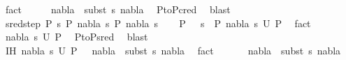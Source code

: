 \begin{isabellebody}
\ fact{\isacharplus}{\kern0pt}\isanewline
\ \ \isamarkupfalse%
\ \isamarkupfalse%
\ {\isachardoublequoteopen}nabla{}\ {\isasymTurnstile}\ {\isacharparenleft}{\kern0pt}subst\ s{}{\isacharparenright}{\kern0pt}\ nabla{}{\isachardoublequoteclose}\ \isamarkupfalse%
\ P{}{\isacharunderscore}{\kern0pt}to{\isacharunderscore}{\kern0pt}P{}{\isacharunderscore}{\kern0pt}cred\ \isamarkupfalse%
\ blast\isanewline
{}\isamarkupfalse%
\isanewline
\ \ \isamarkupfalse%
\ {\isacharparenleft}{\kern0pt}sred{\isacharunderscore}{\kern0pt}step\ P{}\ s\ P{}\ nabla{}\ s{}\ P{}\ nabla{}\ s{}{\isacharparenright}{\kern0pt}\isanewline
\ \ \isamarkupfalse%
\ {\isachardoublequoteopen}P{}\ \ {\isasymturnstile}\ s\ {\isasymleadsto}\ P{}{\isachardoublequoteclose}\ {\isachardoublequoteopen}{\isacharparenleft}{\kern0pt}nabla{}{\isacharcomma}{\kern0pt}\ s{}{\isacharparenright}{\kern0pt}{\isasymin}\ U\ P{}{\isachardoublequoteclose}\ \isamarkupfalse%
\ fact{\isacharplus}{\kern0pt}\ \isanewline
\ \ \isamarkupfalse%
\ \isamarkupfalse%
\ {\isachardoublequoteopen}{\isacharparenleft}{\kern0pt}nabla{}{\isacharcomma}{\kern0pt}\ s{}{\isacharparenright}{\kern0pt}{\isasymin}\ U\ P{}{\isachardoublequoteclose}\ \isamarkupfalse%
\ P{}{\isacharunderscore}{\kern0pt}to{\isacharunderscore}{\kern0pt}P{}{\isacharunderscore}{\kern0pt}sred\ \isamarkupfalse%
\ blast\ \isanewline
\ \ \isamarkupfalse%
\ \isamarkupfalse%
\ IH{\isacharcolon}{\kern0pt}\ {\isachardoublequoteopen}{\isacharparenleft}{\kern0pt}nabla{}{\isacharcomma}{\kern0pt}\ s{}{\isacharparenright}{\kern0pt}{\isasymin}\ U\ P{}\ {\isasymLongrightarrow}\ \ nabla{}\ {\isasymTurnstile}\ {\isacharparenleft}{\kern0pt}subst\ s{}{\isacharparenright}{\kern0pt}\ nabla{}{\isachardoublequoteclose}\ \isamarkupfalse%
\ fact\ \isanewline
\ \ \isamarkupfalse%
\ \isamarkupfalse%
\ {\isachardoublequoteopen}nabla{}\ {\isasymTurnstile}\ {\isacharparenleft}{\kern0pt}subst\ s{}{\isacharparenright}{\kern0pt}\ nabla{}{\isachardoublequoteclose}\ \isamarkupfalse%

\end{isabellebody}

